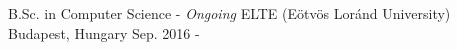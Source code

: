 

\begin{cventries}

  \cventry
    {B.Sc. in Computer Science - \textit{Ongoing}} %
    {ELTE (Eötvös Loránd University)} %
    {Budapest, Hungary} %
    {Sep. 2016 - } %
    {
    }

\end{cventries}
